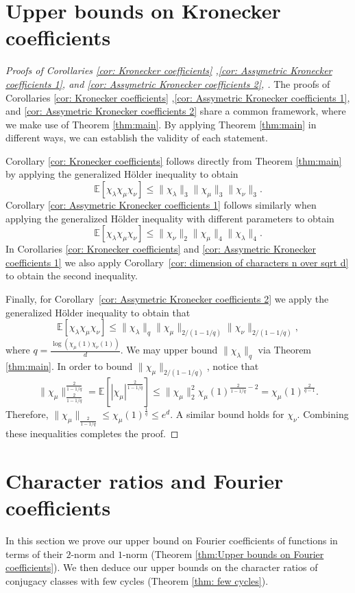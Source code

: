 \documentclass[11pt, letterpaper]{amsart}
\renewcommand\le{\leqslant}
\begin{document}
\section{Upper bounds on Kronecker coefficients}\label{sec:Kronecker}
\begin{proof}[Proofs of Corollaries \ref{cor: Kronecker coefficients} ,\ref{cor: Assymetric Kronecker coefficients 1}, and \ref{cor: Assymetric Kronecker coefficients 2}, ] The proofs of Corollaries \ref{cor: Kronecker coefficients} ,\ref{cor: Assymetric Kronecker coefficients 1}, and \ref{cor: Assymetric Kronecker coefficients 2} share a common framework, where we make use of Theorem \ref{thm:main}. By applying Theorem \ref{thm:main} in different ways, we can establish the validity of each statement.

Corollary \ref{cor: Kronecker coefficients} follows directly from Theorem \ref{thm:main} by applying the generalized H\"{o}lder inequality to obtain \[\mathbb{E}[\chi_{\lambda}\chi_{\mu} \chi_{\nu}] \le \|\chi_{\lambda}\|_3\|\chi_{\mu}\|_3\|\chi_{\nu}\|_3.\]
Corollary \ref{cor: Assymetric Kronecker coefficients 1} follows similarly when applying the generalized H\"{o}lder inequality with different parameters to obtain 
\[
\mathbb{E}[\chi_{\lambda}\chi_{\mu} \chi_{\nu}]\le \|\chi_{\nu}\|_2 \|\chi_\mu\|_4 \| \chi_{\lambda}\|_4.
\]
In Corollaries \ref{cor: Kronecker coefficients} and \ref{cor: Assymetric Kronecker coefficients 1} we also apply Corollary~\ref{cor: dimension of characters n over sqrt d} to obtain the second inequality.

Finally, for Corollary~\ref{cor: Assymetric Kronecker coefficients 2} we apply the generalized H\"{o}lder inequality to obtain that 
\[
\mathbb{E}[\chi_{\lambda}\chi_{\mu} \chi_{\nu}]\le \|\chi_{\lambda}\|_q\|\chi_{\mu}\|_{2/(1-1/q)}\|\chi_{\nu}\|_{2/(1-1/q)},
\]
where $q=\frac{\log(\chi_\mu(1)\chi_{\nu}(1))}{d}$.
We may upper bound $\|\chi_{\lambda}\|_{q}$ via Theorem \ref{thm:main}. In order to bound $\|\chi_{\mu}\|_{2/(1-1/q)}$, notice that
\[ \|\chi_{\mu}\|_{\frac{2}{1-1/q}}^{\frac{2}{1-1/q}} = \mathbb{E}\left[|\chi_{\mu}|^{\frac{2}{1-1/q}}\right] \le \|\chi_{\mu}\|_2^2\chi_{\mu}(1)^{\frac{2}{1-1/q}-2} = \chi_{\mu}(1)^{\frac{2}{q-1}}.\]
Therefore, $\|\chi_{\mu}\|_{\frac{2}{1-1/q}} \le \chi_{\mu}(1)^{\frac{1}{q}} \le e^d$. A similar bound holds for $\chi_{\nu}$.
Combining these inequalities completes the proof.
\end{proof}

\section{Character ratios and Fourier coefficients}\label{sec:Fourier}
In this section we prove our upper bound on Fourier coefficients of functions in terms of their $2$-norm and $1$-norm (Theorem \ref{thm:Upper bounds on Fourier coefficients}). We then deduce our upper bounds on the character ratios of conjugacy classes with few cycles (Theorem \ref{thm: few cycles}). 
\end{document}
